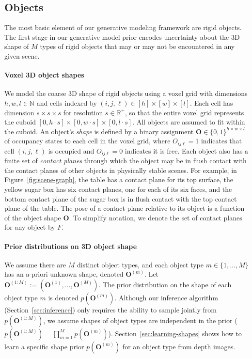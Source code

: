 \subsection{Objects} \label{sec:objects}

The most basic element of our generative modeling framework are rigid objects.
The first stage in our generative model prior encodes uncertainty about the 3D shape of $M$ types of rigid objects that may or may not be encountered in any given scene.


\paragraph{Voxel 3D object shapes}
We model the coarse 3D shape of rigid objects using a voxel grid with dimensions $h,w,l \in \mathbb{N}$ and cells indexed by $(i,j,\ell) \in [h]\times[w]\times[l]$.
Each cell has dimension $s \times s \times s$ for resolution $s \in \mathbb{R}^{+}$, so that the entire voxel grid represents the cuboid $[0, h\cdot s] \times [0, w\cdot s] \times [0, l\cdot s]$.
All objects are assumed to fit within the cuboid.
An object's \textit{shape} is defined by a binary assignment $\mathbf{O} \in \{0, 1\}^{h \times w \times l}$ of occupancy states to each cell in the voxel grid, where $O_{ij\ell} = 1$ indicates that cell $(i, j, \ell)$ is occupied and $O_{ij\ell} = 0$ indicates it is free.
Each object also has a finite set of \emph{contact planes} through which the object may be in flush contact with the contact planes of other objects in physically stable scenes.
For example, in Figure~\ref{fig:scene-graph}, the table has a contact plane for its top surface, the yellow sugar box has six contact planes, one for each of its six faces, and the bottom contact plane of the sugar box is in flush contact with the top contact plane of the table.
The pose of a contact plane relative to its object is a function of the object shape $\mathbf{O}$.
To simplify notation, we denote the set of contact planes for any object by $F$.


\paragraph{Prior distributions on 3D object shape}
We assume there are $M$ distinct object types, and each object type $m \in \{1, \ldots, M\}$ has an a-priori unknown shape, denoted $\mathbf{O}^{(m)}$.
Let $\mathbf{O}^{(1:M)} := (\mathbf{O}^{(1)}, \ldots, \mathbf{O}^{(M)})$.
The prior distribution on the shape of each object type $m$ is denoted $p(\mathbf{O}^{(m)})$.
Although our inference algorithm (Section~\ref{sec:inference}) only requires the ability to sample jointly from $p(\mathbf{O}^{(1:M)})$, we assume shapes of object types are independent in the prior ($p(\mathbf{O}^{(1:M)}) = \prod_{m=1}^M p(\mathbf{O}^{(m)})$).
Section~\ref{sec:learning-shapes} shows how to learn a specific shape prior $p(\mathbf{O}^{(m)})$ for an object type from depth images.


